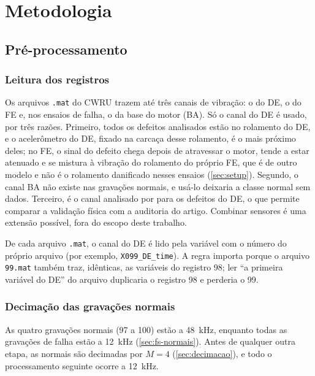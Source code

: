 \chapter{Metodologia}
\label{cap:metodologia}

\section{Pré-processamento}
\label{sec:preprocessamento}

\subsection{Leitura dos registros}

Os arquivos \texttt{.mat} do CWRU trazem até três canais de vibração: o do DE, o
do FE e, nos ensaios de falha, o da base do motor (BA). Só o canal do DE é usado,
por três razões. Primeiro, todos os defeitos analisados estão no rolamento do DE,
e o acelerômetro do DE, fixado na carcaça desse rolamento, é o mais próximo
deles; no FE, o sinal do defeito chega depois de atravessar o motor, tende a
estar atenuado e se mistura à vibração do rolamento do próprio FE, que é de outro
modelo e não é o rolamento danificado nesses ensaios (\autoref{sec:setup}). Segundo, o canal BA não
existe nas gravações normais, e usá-lo deixaria a classe normal sem dados. Terceiro,
é o canal analisado por \textcite{smith2015} para os defeitos do DE, o que
permite comparar a validação física com a auditoria do artigo. Combinar sensores
é uma extensão possível, fora do escopo deste trabalho.

De cada arquivo \texttt{.mat}, o canal do DE é lido pela variável com o
número do próprio arquivo (por exemplo, \texttt{X099\_DE\_time}). A regra
importa porque o arquivo \texttt{99.mat} também traz, idênticas, as variáveis do
registro 98; ler ``a primeira variável do DE'' do arquivo duplicaria o registro 98
e perderia o 99.

\subsection{Decimação das gravações normais}
\label{sec:decimacao-normais}

As quatro gravações normais (97 a 100) estão a \SI{48}{\kilo\hertz}, enquanto
todas as gravações de falha estão a \SI{12}{\kilo\hertz}
(\autoref{sec:fs-normais}). Antes de qualquer outra etapa, as normais são
decimadas por $M = 4$ (\autoref{sec:decimacao}), e todo o processamento seguinte
ocorre a \SI{12}{\kilo\hertz}.

